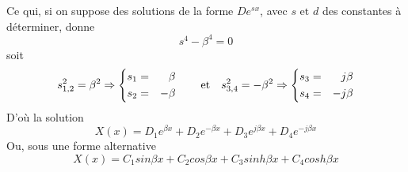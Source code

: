 \documentclass[a4paper,10pt]{article}
\begin{document}
Ce qui, si on suppose des solutions de la forme \begin{math} D e^{sx} \end{math}, avec \begin{math} s \text{ et }  d  \end{math}  des constantes à déterminer, donne 
\begin{equation} s^4 - \beta^4 = 0\end{equation}
soit 
\[  %
s_{1,2}^2 = \beta^2 \Rightarrow 
  \left\{
      \begin{aligned}
        s_1	&=&	\beta\\
        s_2	&=&	-\beta\\
      \end{aligned}
    \right.
\text{\qquad et\quad}
s_{3,4}^2 = -\beta^2 \Rightarrow 
  \left\{
      \begin{aligned}
        s_3	&=&	j\beta\\
        s_4	&=&	-j\beta\\
      \end{aligned}
    \right.
\] %
D'où la solution 
\begin{equation} X(x) = D_1 e^{\beta x} +  D_2 e^{-\beta x} +  D_3 e^{j\beta x} +  D_4 e^{-j\beta x}\end{equation}
Ou, sous une forme alternative 
\begin{equation}  X(x) = C_1 sin{\beta x} +  C_2 cos{\beta x} +  C_3 sinh{\beta x} +  C_4 cosh{\beta x} \end{equation}
\end{document}
